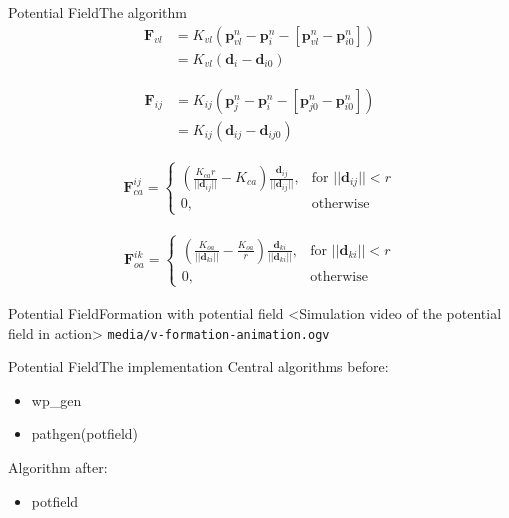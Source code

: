\documentclass[10pt,handout]{beamer}
\begin{document}
\begin{frame}{Potential Field}{The algorithm}
\begin{align}
\mathbf{F}_{vl} &= K_{vl}(\mathbf{p}_{vl}^n-\mathbf{p}_i^n-[\mathbf{p}_{vl}^n-\mathbf{p}_{i0}^n])\\
&= K_{vl}(\mathbf{d}_i-\mathbf{d}_{i0})
\end{align}

\begin{align}
\mathbf{F}_{ij} &= K_{ij}(\mathbf{p}_{j}^n-\mathbf{p}_i^n-[\mathbf{p}_{j0}^n-\mathbf{p}_{i0}^n])\\
&= K_{ij}(\mathbf{d}_{ij}-\mathbf{d}_{ij0})
\end{align}

\begin{align}
    \mathbf{F}_{ca}^{ij}= 
\begin{cases}
    \left(
    \frac{K_{ca}r}{||\mathbf{d}_{ij}||}-K_{ca}
    \right)
    \frac{\mathbf{d}_{ij}}{||\mathbf{d}_{ij}||}
    ,& \text{for } ||\mathbf{d}_{ij}||<r\\
    0,              & \text{otherwise}
\end{cases}
\end{align}

\begin{align}
    \mathbf{F}_{oa}^{ik}= 
\begin{cases}
    \left( \frac{K_{oa}}{||\mathbf{d}_{ki}||}-\frac{K_{oa}}{r}\right)
    \frac{\mathbf{d}_{{ki}}}{||\mathbf{d}_{ki}||},& \text{for } ||\mathbf{d}_{ki}||<r\\
    0,              & \text{otherwise}
\end{cases}
\end{align}
\end{frame}

\begin{frame}{Potential Field}{Formation with potential field}
<Simulation video of the potential field in action>
\texttt{media/v-formation-animation.ogv}
\end{frame}

\begin{frame}{Potential Field}{The implementation}
Central algorithms before:
\begin{itemize}
\item wp\_gen
\item pathgen(potfield)
\end{itemize}
Algorithm after:
\begin{itemize}
\item potfield
\end{itemize}
\end{frame}
\end{document}
